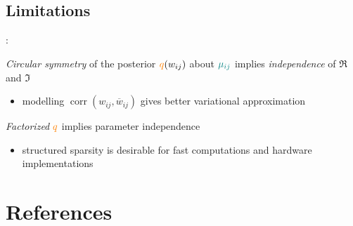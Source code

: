 \documentclass{beamer}
\newcommand{\cplx}{\mathbb{C}}
\newcommand{\conj}[1]{\overline{#1}}
\newcommand{\iu}{{\jmath}}
\begin{document}

\subsection{Limitations} %
\label{sec:limitations}

\begin{frame}[c]{\insertsection: \insertsubsection}

  \emph{Circular symmetry} of the posterior ${\color{orange} q}(w_{ij})$ about
  ${\color{teal} \mu_{ij}}$ implies \emph{independence} of $\Re$ and $\Im$
  \begin{itemize}
    \item modelling $
      \mathop{corr}(w_{ij}, \conj{w}_{ij})
    $ gives better variational approximation
  \end{itemize}

  \bigskip

  \bigskip
  \emph{Factorized} ${\color{orange} q}$ implies parameter independence %
  \begin{itemize}
    \item structured sparsity is desirable for fast computations and hardware implementations
  \end{itemize}


  
\end{frame}



\section{References} %
\label{sec:references}
\end{document}
